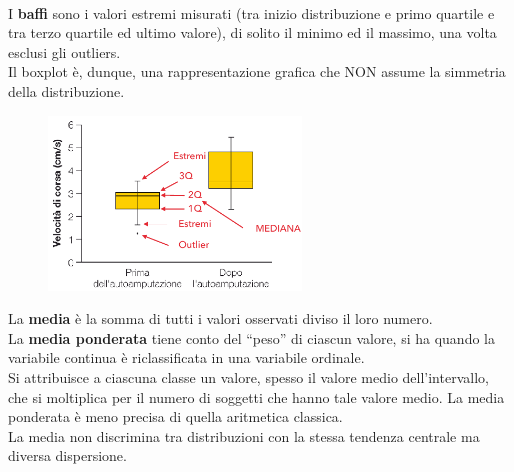 \documentclass[10pt, draft]{book}
\begin{document}
\\
I \textbf{baffi} sono i valori estremi misurati (tra inizio distribuzione e primo quartile e tra terzo quartile ed ultimo valore), di solito il minimo ed il massimo, una volta esclusi gli outliers.
\\
Il boxplot è, dunque, una rappresentazione grafica che NON assume la simmetria della distribuzione.\\
    \begin{figure}[h]\label{fig3.2-2}
    \centering
    \includegraphics[width=0.6\textwidth]{fig3.2-2}
    \caption{\small{}}
    \end{figure}

La \textbf{media} è la somma di tutti i valori osservati diviso il loro numero.
\\
La \textbf{media ponderata} tiene conto del “peso” di ciascun valore, si ha quando la variabile continua è riclassificata in una variabile ordinale.
\\
Si attribuisce a ciascuna classe un valore, spesso il valore medio dell'intervallo, che si moltiplica per il numero di soggetti che hanno tale valore medio. La media ponderata è meno precisa di quella aritmetica classica.
\\
La media non discrimina tra distribuzioni con la stessa tendenza centrale ma diversa dispersione.
\end{document}
